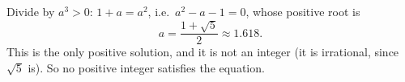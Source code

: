 Divide by $a^3>0$: $1+a=a^2$, i.e.\ $a^2-a-1=0$, whose positive root is
\[
a=\boxed{\dfrac{1+\sqrt5}{2}}\approx1.618 .
\]
This is the only positive solution, and it is not an integer (it is irrational, since $\sqrt5$ is). So no positive integer satisfies the equation.
